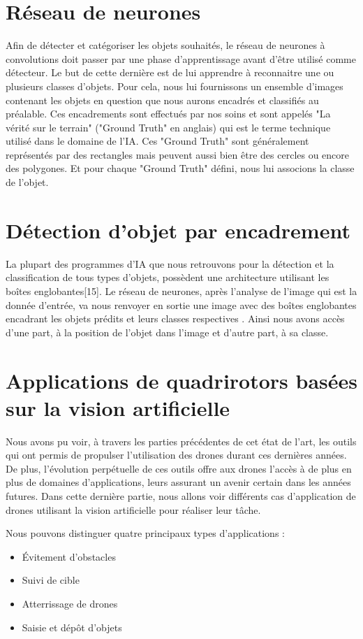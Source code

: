 \documentclass[a4paper,12pt]{report}
\begin{document}
\section{Réseau de neurones}
Afin de détecter et catégoriser les objets souhaités, le réseau de neurones à convolutions
doit passer par une phase d’apprentissage avant d’être utilisé comme détecteur. Le but de
cette dernière est de lui apprendre à reconnaitre une ou plusieurs classes d’objets. Pour cela,
nous lui fournissons un ensemble d’images contenant les objets en question que nous aurons
encadrés et classifiés au préalable. Ces encadrements sont effectués par nos soins et sont
appelés "La vérité sur le terrain" ("Ground Truth" en anglais) qui est le terme technique
utilisé dans le domaine de l’IA. Ces "Ground Truth" sont généralement représentés par des
rectangles mais peuvent aussi bien être des cercles ou encore des polygones. Et pour chaque
"Ground Truth" défini, nous lui associons la classe de l’objet.
\section{Détection d'objet par encadrement}
La plupart des programmes d’IA que nous retrouvons pour la détection et la classification de tous types d’objets, possèdent une architecture utilisant les boîtes englobantes[15]. Le réseau de neurones, après l’analyse de l’image qui est la donnée d’entrée, va nous renvoyer en sortie une image avec des boîtes englobantes encadrant les objets prédits et leurs classes respectives . Ainsi nous avons accès d’une part, à la position de l’objet dans l’image et d’autre part, à sa classe.
\newpage
\section{Applications de quadrirotors basées sur la vision artificielle}
Nous avons pu voir, à travers les parties précédentes de cet état de l’art, les outils qui ont permis de propulser l’utilisation des drones durant ces dernières années. De plus, l’évolution perpétuelle de ces outils offre aux drones l’accès à de plus en plus de domaines d’applications, leurs assurant un avenir certain dans les années futures. Dans cette dernière partie, nous allons voir différents cas d’application de drones utilisant la vision artificielle pour réaliser leur tâche.


Nous pouvons distinguer quatre principaux types d’applications :
\begin{itemize}
\item Évitement d’obstacles 
\item Suivi de cible
\item Atterrissage de drones 
\item Saisie et dépôt d’objets 
\end{itemize}
\end{document}
